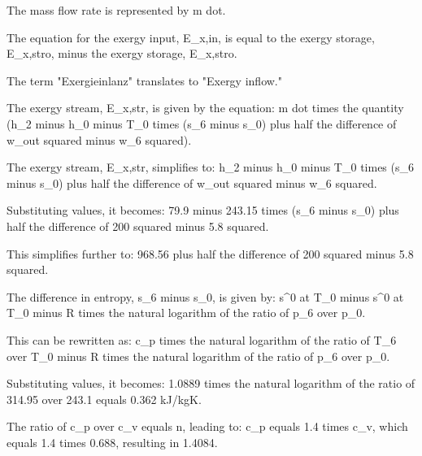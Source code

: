 The mass flow rate is represented by m dot.

The equation for the exergy input, E_x,in, is equal to the exergy storage, E_x,stro, minus the exergy storage, E_x,stro.

The term "Exergieinlanz" translates to "Exergy inflow."

The exergy stream, E_x,str, is given by the equation:
m dot times the quantity (h_2 minus h_0 minus T_0 times (s_6 minus s_0) plus half the difference of w_out squared minus w_6 squared).

The exergy stream, E_x,str, simplifies to:
h_2 minus h_0 minus T_0 times (s_6 minus s_0) plus half the difference of w_out squared minus w_6 squared.

Substituting values, it becomes:
79.9 minus 243.15 times (s_6 minus s_0) plus half the difference of 200 squared minus 5.8 squared.

This simplifies further to:
968.56 plus half the difference of 200 squared minus 5.8 squared.

The difference in entropy, s_6 minus s_0, is given by:
s^0 at T_0 minus s^0 at T_0 minus R times the natural logarithm of the ratio of p_6 over p_0.

This can be rewritten as:
c_p times the natural logarithm of the ratio of T_6 over T_0 minus R times the natural logarithm of the ratio of p_6 over p_0.

Substituting values, it becomes:
1.0889 times the natural logarithm of the ratio of 314.95 over 243.1 equals 0.362 kJ/kgK.

The ratio of c_p over c_v equals n, leading to:
c_p equals 1.4 times c_v, which equals 1.4 times 0.688, resulting in 1.4084.
